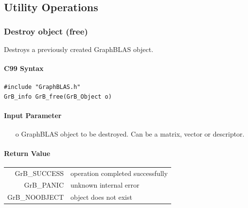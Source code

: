 \documentclass[11pt]{extarticle}
\begin{document}
\subsection{Utility Operations}

\subsubsection{Destroy object ({\sf free})}

Destroys a previously created GraphBLAS object.

\paragraph{C99 Syntax}

\begin{verbatim}
#include "GraphBLAS.h"
GrB_info GrB_free(GrB_Object o)
\end{verbatim}


\paragraph{Input Parameter}

\begin{itemize}
	\item[{\sf o}] GraphBLAS object to be destroyed. Can be a matrix, vector or descriptor.
\end{itemize}

\paragraph{Return Value}

\begin{tabular}{rl}
{\sf GrB\_SUCCESS}	& operation completed successfully \\
{\sf GrB\_PANIC}	& unknown internal error \\
{\sf GrB\_NOOBJECT}	& object does not exist \\
\end{tabular}


\end{document}
